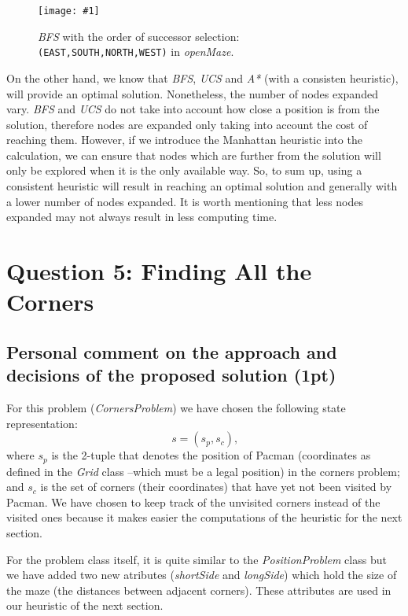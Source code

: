 \documentclass{article}
\newcommand{\myFigure}[4]{%
    \begin{figure}[H]
        \texttt{[image: \#1]}
        \centering
        \caption{#2}
        \label{#3}
    \end{figure}
}
\begin{document}
\myFigure{./img/ex4/openMaze_dif_order}{\emph{BFS} with the order of successor selection: \texttt{(EAST,SOUTH,NORTH,WEST)} in \emph{openMaze}.}{openMaze2}{.8}

On the other hand, we know that \textit{BFS}, \textit{UCS} and \textit{A*} (with a consisten heuristic), will provide an optimal solution. Nonetheless, the number of nodes expanded vary.  
\textit{BFS} and \textit{UCS} do not take into account how close a position is from the solution, therefore nodes are expanded only taking into account the cost of reaching them. However, if we introduce the Manhattan heuristic into the calculation, we can ensure that nodes which are further from the solution will only be explored when it is the only available way. So, to sum up, using a consistent heuristic will result in reaching an optimal solution and generally with a lower number of nodes expanded. It is worth mentioning that less nodes expanded may not always result in less computing time.


\pagebreak
\section{Question 5: Finding All the Corners}

\subsection{Personal comment on the approach and decisions of the proposed solution (1pt)}

For this problem (\emph{CornersProblem}) we have chosen the following state representation: 
\begin{equation}
s = (s_p, s_c)\text{,}
\label{state}
\end{equation}
where $s_p$ is the 2-tuple that denotes the position of Pacman (coordinates as defined in the \emph{Grid} class --which must be a legal position) in the corners problem; and $s_c$ is the set of corners (their coordinates) that have yet not been visited by Pacman. We have chosen to keep track of the unvisited corners instead of the visited ones because it makes easier the computations of the heuristic for the next section.

For the problem class itself, it is quite similar to the \emph{PositionProblem} class but we have added two new atributes (\emph{shortSide} and \emph{longSide}) which hold the size of the maze (the distances between adjacent corners). These attributes are used in our heuristic of the next section.
\end{document}
